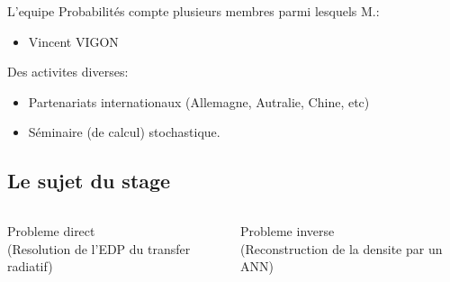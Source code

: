 \begin{frame}
	L'equipe Probabilités compte plusieurs membres parmi lesquels M.: %
	\begin{itemize}
		\item Vincent VIGON
  \end{itemize}

  \pause
  Des activites diverses:
	\begin{itemize}
		\item Partenariats internationaux (Allemagne, Autralie, Chine, etc)  %
		\item Séminaire (de calcul) stochastique.  %
  \end{itemize}


\end{frame}

\subsection{Le sujet du stage}

\begin{frame}

\begin{columns}
 \begin{column}{0.5\textwidth}
  \centering
    Probleme direct \\ (\scriptsize Resolution de l'EDP du transfer radiatif)
 \end{column}
 \pause
 \begin{column}{0.5\textwidth}
    \centering
    Probleme inverse \\ (\scriptsize Reconstruction de la densite par un ANN)
 \end{column}
\end{columns}

\end{frame}

